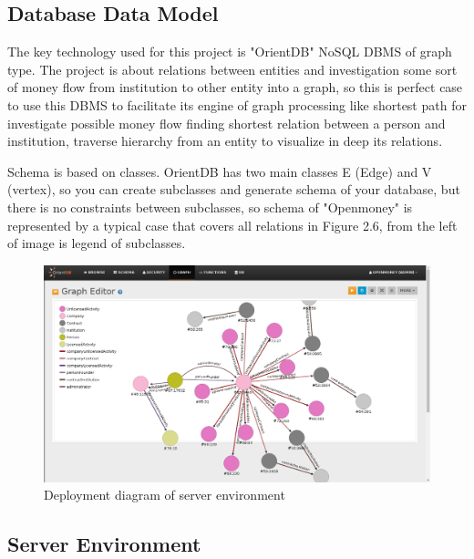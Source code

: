 \documentclass[12pt,a4paper,titlepage]{article}
\begin{document}
\subsection{Database Data Model}

The key technology used for this project is "OrientDB" NoSQL DBMS of graph type. The project is about relations between entities and investigation some sort of money flow from institution to other entity into a graph, so this is perfect case to use this DBMS to facilitate its engine of graph processing like shortest path for investigate possible money flow finding shortest relation between a person and institution, traverse hierarchy from an entity to visualize in deep its relations.

Schema is based on classes. OrientDB has two main classes E (Edge) and V (vertex), so you can create subclasses and generate schema of your database, but there is no constraints between subclasses, so schema of "Openmoney" is represented by a typical case that covers all relations in Figure 2.6, from the left of image is legend of subclasses.

\begin{figure}[!ht] 
	\renewcommand\thefigure{2.6} %
	\centering 
	\includegraphics[width=14cm]{schema.png} 
	\caption{ Deployment diagram of server environment }\label{fig:2.5}
	\end{figure}


\subsection{Server Environment}
\end{document}

